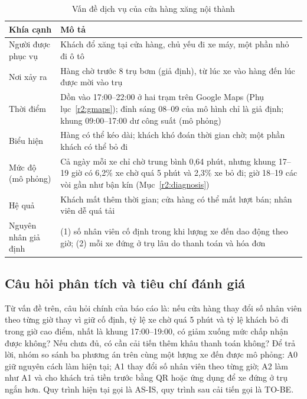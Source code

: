\begin{table}[!htbp]\centering\small
\caption{Vấn đề dịch vụ của cửa hàng xăng nội thành}\label{r1:problem}
\begin{tabularx}{\linewidth}{@{}p{34mm}Y@{}}
\toprule
\textbf{Khía cạnh} & \textbf{Mô tả} \\
\midrule
Người được phục vụ & Khách đổ xăng tại cửa hàng, chủ yếu đi xe máy, một phần nhỏ đi ô tô \\
Nơi xảy ra & Hàng chờ trước 8 trụ bơm (giả định), từ lúc xe vào hàng đến lúc được mời vào trụ \\
Thời điểm & Dồn vào 17:00--22:00 ở hai trạm trên Google Maps (Phụ lục~\ref{r2:gmaps}); đỉnh sáng 08--09 của mô hình chỉ là giả định; khung 09:00--17:00 dư công suất (mô phỏng) \\
Biểu hiện & Hàng có thể kéo dài; khách khó đoán thời gian chờ; một phần khách có thể bỏ đi \\
Mức độ (mô phỏng) & Cả ngày mỗi xe chỉ chờ trung bình 0,64 phút, nhưng khung 17--19 giờ có 6,2\% xe chờ quá 5 phút và 2,3\% xe bỏ đi; giờ 18--19 các vòi gần như bận kín (Mục~\ref{r2:diagnosis}) \\
Hệ quả & Khách mất thêm thời gian; cửa hàng có thể mất lượt bán; nhân viên dễ quá tải \\
Nguyên nhân giả định & (1) số nhân viên cố định trong khi lượng xe đến dao động theo giờ; (2) mỗi xe đứng ở trụ lâu do thanh toán và hóa đơn \\
\bottomrule
\end{tabularx}
\end{table}



\subsection{Câu hỏi phân tích và tiêu chí đánh giá}
\noindent
Từ vấn đề trên, câu hỏi chính của báo cáo là: nếu cửa hàng thay đổi số nhân viên theo từng giờ thay vì giữ cố định, tỷ lệ xe chờ quá 5 phút và tỷ lệ khách bỏ đi trong giờ cao điểm, nhất là khung 17:00--19:00, có giảm xuống mức chấp nhận được không? Nếu chưa đủ, có cần cải tiến thêm khâu thanh toán không? Để trả lời, nhóm so sánh ba phương án trên cùng một lượng xe đến được mô phỏng: A0 giữ nguyên cách làm hiện tại; A1 thay đổi số nhân viên theo từng giờ; A2 làm như A1 và cho khách trả tiền trước bằng QR hoặc ứng dụng để xe đứng ở trụ ngắn hơn. Quy trình hiện tại gọi là AS-IS, quy trình sau cải tiến gọi là TO-BE.

